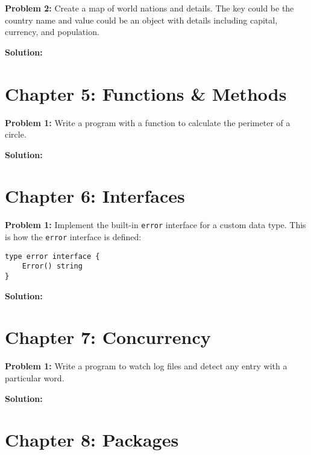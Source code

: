 

\textbf{Problem 2:} Create a map of world nations and details. The key could
be the country name and value could be an object with details including capital,
currency, and population.

\textbf{Solution:}



\section*{Chapter 5: Functions \& Methods}

\textbf{Problem 1:} Write a program with a function to calculate the perimeter of a circle.

\textbf{Solution:}



\section*{Chapter 6: Interfaces}

\textbf{Problem 1:} Implement the built-in \texttt{error} interface for a custom data type.  This is how the \texttt{error} interface is defined:

\begin{lstlisting}[numbers=none]
type error interface {
    Error() string
}
\end{lstlisting}

\textbf{Solution:}



\section*{Chapter 7: Concurrency}

{\bfseries Problem 1:} Write a program to watch log files and detect
any entry with a particular word.

\textbf{Solution:}



\section*{Chapter 8: Packages}

